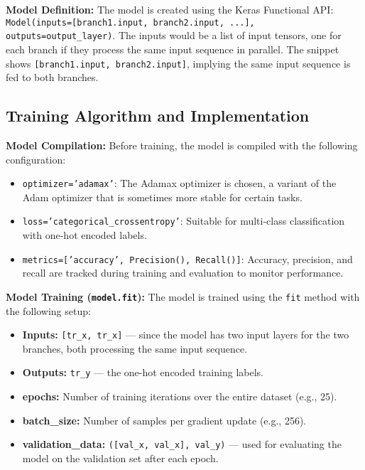 \documentclass[twocolumn]{article}
\begin{document}
\vspace{0.5em}
\textbf{Model Definition:}
The model is created using the Keras Functional API:
\texttt{Model(inputs=[branch1.input, branch2.input, ...], outputs=output\_layer)}.
The inputs would be a list of input tensors, one for each branch if they process the same input sequence in parallel. The snippet shows \texttt{[branch1.input, branch2.input]}, implying the same input sequence is fed to both branches.

\subsection{Training Algorithm and Implementation}

\vspace{0.5em}
\textbf{Model Compilation:} 
Before training, the model is compiled with the following configuration:
\begin{itemize}
    \item \texttt{optimizer='adamax'}: The Adamax optimizer is chosen, a variant of the Adam optimizer that is sometimes more stable for certain tasks.
    \item \texttt{loss='categorical\_crossentropy'}: Suitable for multi-class classification with one-hot encoded labels.
    \item \texttt{metrics=['accuracy', Precision(), Recall()]}: Accuracy, precision, and recall are tracked during training and evaluation to monitor performance.
\end{itemize}

\vspace{0.5em}
\textbf{Model Training (\texttt{model.fit}):}
The model is trained using the \texttt{fit} method with the following setup:
\begin{itemize}
    \item \textbf{Inputs:} \texttt{[tr\_x, tr\_x]} — since the model has two input layers for the two branches, both processing the same input sequence.
    \item \textbf{Outputs:} \texttt{tr\_y} — the one-hot encoded training labels.
    \item \textbf{epochs:} Number of training iterations over the entire dataset (e.g., 25).
    \item \textbf{batch\_size:} Number of samples per gradient update (e.g., 256).
    \item \textbf{validation\_data:} \texttt{([val\_x, val\_x], val\_y)} — used for evaluating the model on the validation set after each epoch.
\end{itemize}
\end{document}
